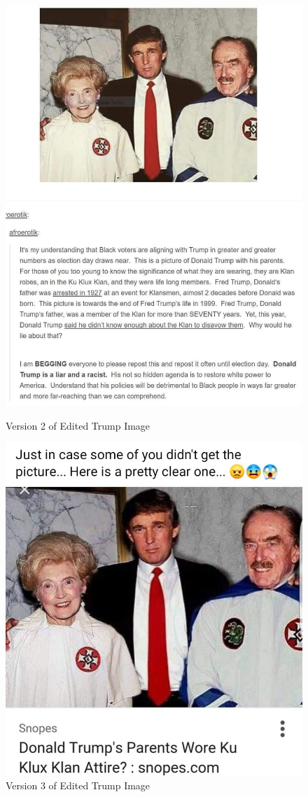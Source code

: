 \documentclass[preprint,review,12pt]{elsarticle}
\begin{document}
\begin{figure}[h]
  \includegraphics[width=\linewidth]{trumpkkk2.jpg}
  \caption{Version 2 of Edited Trump Image}\label{fig:TrumpKKK2}
\endminipage\hfill
{}%
  \includegraphics[width=\linewidth]{trumpkkk3.jpg}
  \caption{Version 3 of Edited Trump Image}\label{fig:TrumpKKK3}
\endminipage
\end{figure}
\end{document}
